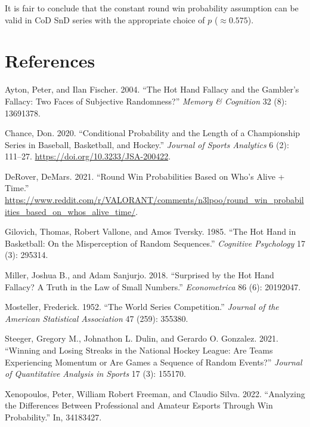 \documentclass{article}
\newlength{\cslhangindent}
\newlength{\cslentryspacingunit} %
\newenvironment{CSLReferences}[2] %
 {%
  \setlength{\parindent}{0pt}
  \ifodd #1
  \let\oldpar\par
  \def\par{\hangindent=\cslhangindent\oldpar}
  \fi
  \setlength{\parskip}{#2\cslentryspacingunit}
 }%
 {}
\begin{document}
It is fair to conclude that the constant round win probability
assumption can be valid in CoD SnD series with the appropriate choice of
\(p\) (\(\approx 0.575\)).

\hypertarget{references}{%
\section*{References}\label{references}}

\hypertarget{refs}{}
\begin{CSLReferences}{1}{0}
\leavevmode{}%
Ayton, Peter, and Ilan Fischer. 2004. {``The Hot Hand Fallacy and the
Gambler{'}s Fallacy: Two Faces of Subjective Randomness?''} \emph{Memory
\& Cognition} 32 (8): 13691378.

\leavevmode{}%
Chance, Don. 2020. {``Conditional Probability and the Length of a
Championship Series in Baseball, Basketball, and Hockey.''}
\emph{Journal of Sports Analytics} 6 (2): 111--27.
\url{https://doi.org/10.3233/JSA-200422}.

\leavevmode{}%
DeRover, DeMars. 2021. {``Round Win Probabilities Based on Who's Alive +
Time.''}
\url{https://www.reddit.com/r/VALORANT/comments/n3lpoo/round_win_probabilities_based_on_whos_alive_time/}.

\leavevmode{}%
Gilovich, Thomas, Robert Vallone, and Amos Tversky. 1985. {``The Hot
Hand in Basketball: On the Misperception of Random Sequences.''}
\emph{Cognitive Psychology} 17 (3): 295314.

\leavevmode{}%
Miller, Joshua B., and Adam Sanjurjo. 2018. {``Surprised by the Hot Hand
Fallacy? A Truth in the Law of Small Numbers.''} \emph{Econometrica} 86
(6): 20192047.

\leavevmode{}%
Mosteller, Frederick. 1952. {``The World Series Competition.''}
\emph{Journal of the American Statistical Association} 47 (259): 355380.

\leavevmode{}%
Steeger, Gregory M., Johnathon L. Dulin, and Gerardo O. Gonzalez. 2021.
{``Winning and Losing Streaks in the National Hockey League: Are Teams
Experiencing Momentum or Are Games a Sequence of Random Events?''}
\emph{Journal of Quantitative Analysis in Sports} 17 (3): 155170.

\leavevmode{}%
Xenopoulos, Peter, William Robert Freeman, and Claudio Silva. 2022.
{``Analyzing the Differences Between Professional and Amateur Esports
Through Win Probability.''} In, 34183427.

\end{CSLReferences}



\end{document}
